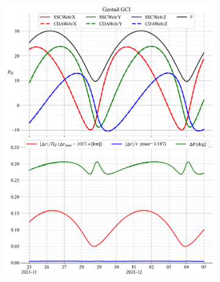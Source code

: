 \documentclass[draft]{agujournal2019}
\begin{document}
\begin{figure}[h]
     \centering
     \begin{subfigure}[b]{0.49\textwidth}
         \centering
         \includegraphics[width=\textwidth]{figures/Geotail_GCI_SSCWeb_vs_CDAWeb.pdf}
     \end{subfigure}
     \begin{subfigure}[b]{0.49\textwidth}
         \centering

\end{subfigure}
\end{figure}
\end{document}
